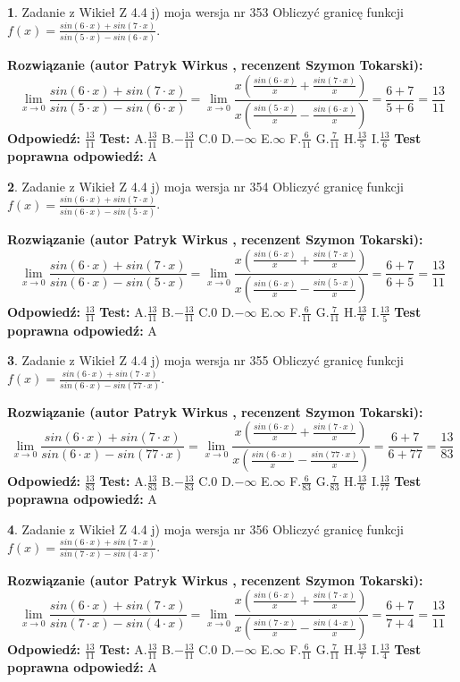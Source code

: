\documentclass[12pt, a4paper]{article}
\theoremstyle{definition} %
\newtheorem{zad}{}
\newcommand{\zadStart}[1]{\begin{zad}#1\newline}
\newcommand{\zadStop}{\end{zad}}
\newcommand{\rozwStart}[2]{\noindent \textbf{Rozwiązanie (autor #1 , recenzent #2): }\newline}
\newcommand{\rozwStop}{\newline}
\newcommand{\odpStart}{\noindent \textbf{Odpowiedź:}\newline}
\newcommand{\odpStop}{\newline}
\newcommand{\testStart}{\noindent \textbf{Test:}\newline}
\newcommand{\testStop}{\newline}
\newcommand{\kluczStart}{\noindent \textbf{Test poprawna odpowiedź:}\newline}
\newcommand{\kluczStop}{\newline}
\begin{document}
\zadStart{Zadanie z Wikieł Z 4.4 j) moja wersja nr 353}
Obliczyć granicę funkcji $f(x)=\frac{sin(6\cdot x) +sin(7\cdot x)}{sin(5\cdot x) -sin(6\cdot x)}$.
\zadStop
\rozwStart{Patryk Wirkus}{Szymon Tokarski}
$$\lim\limits_{x\to 0}\frac{sin(6\cdot x) +sin(7\cdot x)}{sin(5\cdot x) -sin(6\cdot x)}=\lim\limits_{x\to 0}\frac{x(\frac{sin(6\cdot x)}{x}+\frac{sin(7\cdot x)}{x})}{x(\frac{sin(5\cdot x)}{x}-\frac{sin(6\cdot x)}{x})}=\frac{6+7}{5+6} = \frac{13}{11}$$
\rozwStop
\odpStart
$\frac{13}{11}$
\odpStop
\testStart
A.$\frac{13}{11}$
B.$-\frac{13}{11}$
C.$0$
D.$-\infty$
E.$\infty$
F.$\frac{6}{11}$
G.$\frac{7}{11}$
H.$\frac{13}{5}$
I.$\frac{13}{6}$
\testStop
\kluczStart
A
\kluczStop



\zadStart{Zadanie z Wikieł Z 4.4 j) moja wersja nr 354}
Obliczyć granicę funkcji $f(x)=\frac{sin(6\cdot x) +sin(7\cdot x)}{sin(6\cdot x) -sin(5\cdot x)}$.
\zadStop
\rozwStart{Patryk Wirkus}{Szymon Tokarski}
$$\lim\limits_{x\to 0}\frac{sin(6\cdot x) +sin(7\cdot x)}{sin(6\cdot x) -sin(5\cdot x)}=\lim\limits_{x\to 0}\frac{x(\frac{sin(6\cdot x)}{x}+\frac{sin(7\cdot x)}{x})}{x(\frac{sin(6\cdot x)}{x}-\frac{sin(5\cdot x)}{x})}=\frac{6+7}{6+5} = \frac{13}{11}$$
\rozwStop
\odpStart
$\frac{13}{11}$
\odpStop
\testStart
A.$\frac{13}{11}$
B.$-\frac{13}{11}$
C.$0$
D.$-\infty$
E.$\infty$
F.$\frac{6}{11}$
G.$\frac{7}{11}$
H.$\frac{13}{6}$
I.$\frac{13}{5}$
\testStop
\kluczStart
A
\kluczStop



\zadStart{Zadanie z Wikieł Z 4.4 j) moja wersja nr 355}
Obliczyć granicę funkcji $f(x)=\frac{sin(6\cdot x) +sin(7\cdot x)}{sin(6\cdot x) -sin(77\cdot x)}$.
\zadStop
\rozwStart{Patryk Wirkus}{Szymon Tokarski}
$$\lim\limits_{x\to 0}\frac{sin(6\cdot x) +sin(7\cdot x)}{sin(6\cdot x) -sin(77\cdot x)}=\lim\limits_{x\to 0}\frac{x(\frac{sin(6\cdot x)}{x}+\frac{sin(7\cdot x)}{x})}{x(\frac{sin(6\cdot x)}{x}-\frac{sin(77\cdot x)}{x})}=\frac{6+7}{6+77} = \frac{13}{83}$$
\rozwStop
\odpStart
$\frac{13}{83}$
\odpStop
\testStart
A.$\frac{13}{83}$
B.$-\frac{13}{83}$
C.$0$
D.$-\infty$
E.$\infty$
F.$\frac{6}{83}$
G.$\frac{7}{83}$
H.$\frac{13}{6}$
I.$\frac{13}{77}$
\testStop
\kluczStart
A
\kluczStop



\zadStart{Zadanie z Wikieł Z 4.4 j) moja wersja nr 356}
Obliczyć granicę funkcji $f(x)=\frac{sin(6\cdot x) +sin(7\cdot x)}{sin(7\cdot x) -sin(4\cdot x)}$.
\zadStop
\rozwStart{Patryk Wirkus}{Szymon Tokarski}
$$\lim\limits_{x\to 0}\frac{sin(6\cdot x) +sin(7\cdot x)}{sin(7\cdot x) -sin(4\cdot x)}=\lim\limits_{x\to 0}\frac{x(\frac{sin(6\cdot x)}{x}+\frac{sin(7\cdot x)}{x})}{x(\frac{sin(7\cdot x)}{x}-\frac{sin(4\cdot x)}{x})}=\frac{6+7}{7+4} = \frac{13}{11}$$
\rozwStop
\odpStart
$\frac{13}{11}$
\odpStop
\testStart
A.$\frac{13}{11}$
B.$-\frac{13}{11}$
C.$0$
D.$-\infty$
E.$\infty$
F.$\frac{6}{11}$
G.$\frac{7}{11}$
H.$\frac{13}{7}$
I.$\frac{13}{4}$
\testStop
\kluczStart
A
\kluczStop
\end{document}

